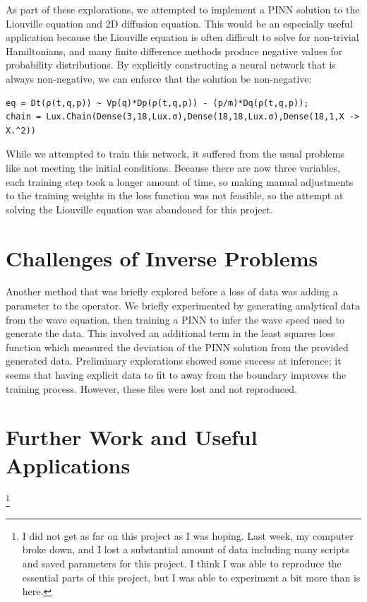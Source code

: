 \documentclass[11pt]{article}
\newcommand{\1}{\mathbf 1}
\begin{document}
As part of these explorations, we attempted to implement a PINN solution to the Liouville equation and 2D diffusion equation.
This would be an especially useful application because the Liouville equation is often difficult to solve for non-trivial Hamiltonians, and many finite difference methods produce negative values for probability distributions.
By explicitly constructing a neural network that is always non-negative, we can enforce that the solution be non-negative:
\begin{singlespace}
\begin{verbatim}
eq = Dt(ρ(t,q,p)) ~ Vp(q)*Dp(ρ(t,q,p)) - (p/m)*Dq(ρ(t,q,p));
chain = Lux.Chain(Dense(3,18,Lux.σ),Dense(18,18,Lux.σ),Dense(18,1,X -> X.^2))
\end{verbatim}
\end{singlespace}
\noindent
While we attempted to train this network, it suffered from the usual problems like not meeting the initial conditions.
Because there are now three variables, each training step took a longer amount of time, so making manual adjustments to the training weights in the loss function was not feasible, so the attempt at solving the Liouville equation was abandoned for this project.

\section{Challenges of Inverse Problems}

Another method that was briefly explored before a loss of data was adding a parameter to the operator.
We briefly experimented by generating analytical data from the wave equation, then training a PINN to infer the wave speed used to generate the data.
This involved an additional term in the least squares loss function which measured the deviation of the PINN solution from the provided generated data.
Preliminary explorations showed some success at inference; it seems that having explicit data to fit to away from the boundary improves the training process.
However, these files were lost and not reproduced.

\section{Further Work and Useful Applications}

\footnote{I did not get as far on this project as I was hoping.
Last week, my computer broke down, and I lost a substantial amount of data including many scripts and saved parameters for this project.
I think I was able to reproduce the essential parts of this project, but I was able to experiment a bit more than is here.}
\end{document}
